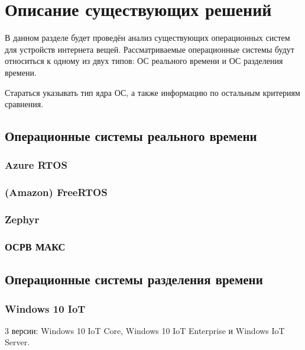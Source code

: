 \chapter{Описание существующих решений}
\label{cha:methods}

В данном разделе будет проведён анализ существующих операционных систем для устройств интернета вещей. Рассматриваемые операционные системы будут относиться к одному из двух типов: ОС реального времени и ОС разделения времени.

Стараться указывать тип ядра ОС, а также информацию по остальным критериям сравнения.

\section{Операционные системы реального времени}

\subsection{Azure RTOS}

\cite{OS_questions}



\subsection{(Amazon) FreeRTOS}



\subsection{Zephyr}



\subsection{ОСРВ МАКС}



\section{Операционные системы разделения времени}



\subsection{Windows 10 IoT}

3 версии: Windows 10 IoT Core, Windows 10 IoT Enterprise и Windows IoT Server. \cite{OS_questions}



